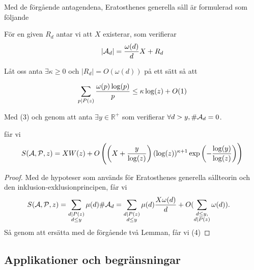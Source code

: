 Med de förgående antagendena, Eratosthenes generella såll är formulerad som följande\cite{Dalton}
\begin{theorem}\hfill

För en given $ R_{d} $ antar vi att $ X $ existerar, som verifierar
\[\vert\mathcal{A}_{d}\vert =\frac{\omega(d)}{d}X +R_{d} \]

Låt oss anta $ \exists \kappa\geq 0 $ och $ \vert R_{d}\vert = O(\omega(d))$ på ett sätt så att

\[\sum_{p\mid P(z)}\frac{\omega(p)\log(p)}{p}\leq \kappa \log(z)+O(1)\]


Med (3) och genom att anta $ \exists y\in \mathbb{R}^{+} $ som verifierar $ \forall d>y, \# \mathcal{A}_d=0 $.

får vi
\begin{equation}
\label{equationEL4}
S(\mathcal{\mathcal{A}}, \mathcal{\mathcal{P}}, z)= XW(z)+O\left( \left( X+\frac{y}{\log(z)} \right)(\log(z))^{\kappa+1}\exp \left( -\frac{\log(y)}{\log(z)} \right) \right)
\end{equation}
\end{theorem}
\begin{proof}
Med de hypoteser som används för Eratosthenes generella sållteorin och den inklusion-exklusionprincipen, får vi
\begin{align*}
S(\mathcal{\mathcal{A}}, \mathcal{\mathcal{P}}, z) &=\sum_{\substack{d\mid P(z)\\d\leq y}}\mu(d)\#\mathcal{A}_{d} =\sum_{\substack{d\mid P(z)\\d\leq y}}\mu(d)\frac{X\omega(d)}{d}+O(\sum_{\substack{d\leq y,\\ d \mid P(z)}} \omega(d)).
\end{align*}
Så genom att ersätta med de förgående två Lemman, får vi (4)
\end{proof}


\subsection{Applikationer och begränsningar}

